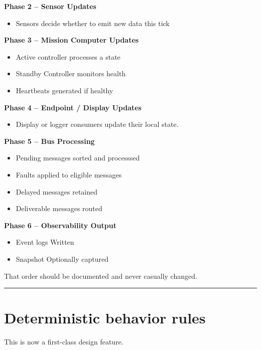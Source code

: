 \documentclass{report}
\begin{document}
\textbf{Phase 2 -- Sensor Updates}
\begin{itemize}
   \item Sensors decide whether to emit new data this tick
\end{itemize}

\textbf{Phase 3 -- Mission Computer Updates}
\begin{itemize}
   \item Active controller processes a state 
   \item Standby Controller monitors health 
   \item Heartbeats generated if healthy
\end{itemize}

\textbf{Phase 4 -- Endpoint / Display Updates}
\begin{itemize}
   \item Display or logger consumers update their local state. 
\end{itemize}

\textbf{Phase 5 -- Bus Processing}
\begin{itemize}
   \item Pending messages sorted and processsed
   \item Faults applied to eligible messages
   \item Delayed messages retained
   \item Deliverable messages routed
\end{itemize}

\textbf{Phase 6 -- Observability Output}
\begin{itemize}
   \item Event logs Written
   \item Snapshot Optionally captured
\end{itemize}

That order should be documented and never casually changed.

\begin{center}
\rule{0.9\textwidth}{1pt}
\end{center}
\section{Deterministic behavior rules}

This is now a first-class design feature. 
\end{document}
